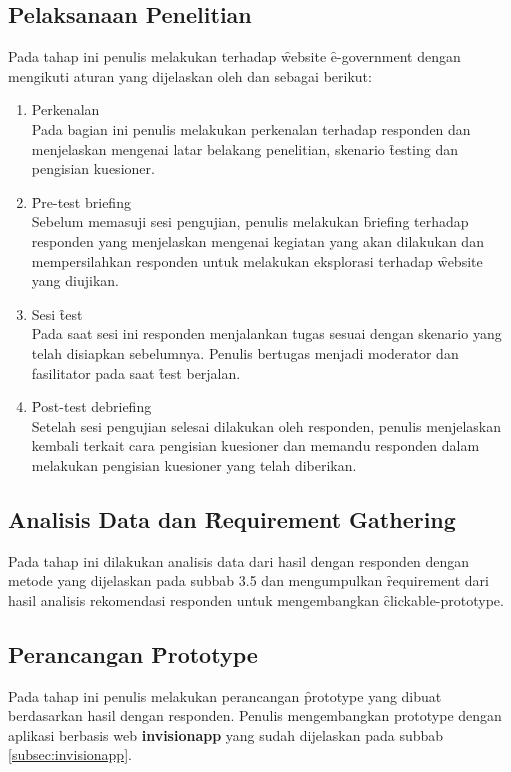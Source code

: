 \subsection{Pelaksanaan Penelitian}
Pada tahap ini penulis melakukan \ust \space terhadap \f{website} \f{e-government} dengan mengikuti aturan yang dijelaskan oleh \citet{buku.rubin} dan \citet{buku.dumas} sebagai berikut:
\begin{enumerate}
	\item Perkenalan\\
	Pada bagian ini penulis melakukan perkenalan terhadap responden dan menjelaskan mengenai latar belakang penelitian, skenario \f{testing} dan pengisian kuesioner.
	\item \f{Pre-test briefing}\\
	Sebelum memasuji sesi pengujian, penulis melakukan \f{briefing} terhadap responden yang menjelaskan mengenai kegiatan yang akan dilakukan dan mempersilahkan responden untuk melakukan eksplorasi terhadap \f{website} yang diujikan.
	\item Sesi \f{test}\\
	Pada saat sesi ini responden menjalankan tugas sesuai dengan skenario yang telah disiapkan sebelumnya. Penulis bertugas menjadi moderator dan fasilitator pada saat \f{test} berjalan.
	\item \f{Post-test debriefing}\\
	Setelah sesi pengujian selesai dilakukan oleh responden, penulis menjelaskan kembali terkait cara pengisian kuesioner dan memandu responden dalam melakukan pengisian kuesioner yang telah diberikan.
\end{enumerate}
\subsection{Analisis Data dan \f{Requirement Gathering}}
Pada tahap ini dilakukan analisis data dari hasil \ust \space dengan responden  dengan metode yang dijelaskan pada subbab 3.5 dan mengumpulkan \f{requirement} dari hasil analisis rekomendasi responden untuk mengembangkan \f{clickable-prototype}. 
\subsection{Perancangan \f{Prototype}}
Pada tahap ini penulis melakukan perancangan \f{prototype} yang dibuat berdasarkan hasil \ust \space dengan responden. Penulis mengembangkan prototype dengan aplikasi berbasis web \textbf{invisionapp} yang sudah dijelaskan pada subbab \ref{subsec:invisionapp}. 
